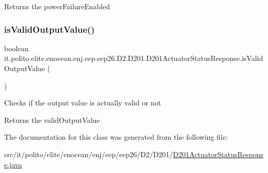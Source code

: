 \begin{DoxyReturn}{Returns}
the power\+Failure\+Enabled 
\end{DoxyReturn}
\hypertarget{classit_1_1polito_1_1elite_1_1enocean_1_1enj_1_1eep_1_1eep26_1_1_d2_1_1_d201_1_1_d201_actuator_status_response_a4bbde15a318d004a1bbb8f6ed8df8bc9}{}\label{classit_1_1polito_1_1elite_1_1enocean_1_1enj_1_1eep_1_1eep26_1_1_d2_1_1_d201_1_1_d201_actuator_status_response_a4bbde15a318d004a1bbb8f6ed8df8bc9} 
\subsubsection{\texorpdfstring{is\+Valid\+Output\+Value()}{isValidOutputValue()}}
{\footnotesize\ttfamily boolean it.\+polito.\+elite.\+enocean.\+enj.\+eep.\+eep26.\+D2.\+D201.\+D201\+Actuator\+Status\+Response.\+is\+Valid\+Output\+Value (\begin{DoxyParamCaption}{ }\end{DoxyParamCaption})}

Checks if the output value is actually valid or not

\begin{DoxyReturn}{Returns}
the valid\+Output\+Value 
\end{DoxyReturn}


The documentation for this class was generated from the following file\+:\begin{DoxyCompactItemize}
\item 
src/it/polito/elite/enocean/enj/eep/eep26/\+D2/\+D201/\hyperlink{_d201_actuator_status_response_8java}{D201\+Actuator\+Status\+Response.\+java}\end{DoxyCompactItemize}
